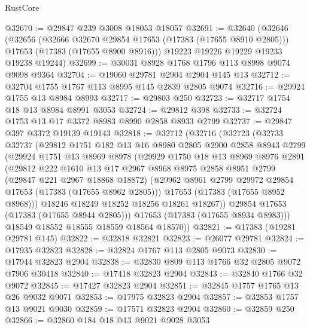 \begin{lexlean}{RustCore}
\begin{coremodule}
@32670 := @29847 @239 @3008 @18053 @18057
@32691 := @32640
    (@32646
      (@32656
        (@32666 @32670 @29854 @17653 (@17383 (@17655 @8910 @2805)))
        @17653
        (@17383 (@17655 @8900 @8916)))
      @19223
      @19226
      @19229
      @19233
      @19238
      @19244)
@32699 := @30031 @8928 @1768 @1796 @113 @8998 @9074 @9098 @9364
@32704 := @19060 @29781 @2904 @2904 @145 @13
@32712 := @32704 @1755 @1767 @113 @8995 @145 @2839 @2805 @9074
@32716 := @29924 @1755 @13 @8984 @8993
@32717 := @29803 @250
@32723 := @32717 @1754 @18 @13 @8984 @8991 @3053
@32724 := @29812 @398
@32733 := @32724 @1753 @13 @17 @3372 @8983 @8990 @2858 @8933 @2799
@32737 := @29847 @397 @3372 @19139 @19143
@32818 := @32712
    (@32716
      (@32723
        (@32733
          @32737
          (@29812
            @1751
            @182
            @13
            @16
            @8980
            @2805
            @2900
            @2858
            @8943
            @2799
            (@29924
              @1751
              @13
              @8969
              @8978
              (@29929
                @1750
                @18
                @13
                @8969
                @8976
                @2891
                (@29812
                  @222
                  @1610
                  @13
                  @17
                  @2967
                  @8968
                  @8975
                  @2858
                  @8951
                  @2799
                  (@29847 @221 @2967 @18868 @18872)
                  (@29962 @8961 @2799 @29972 @29854 @17653 (@17383 (@17655 @8962 @2805)))
                  @17653
                  (@17383 (@17655 @8952 @8968)))
                @18246
                @18249
                @18252
                @18256
                @18261
                @18267))
            @29854
            @17653
            (@17383 (@17655 @8944 @2805)))
          @17653
          (@17383 (@17655 @8934 @8983)))
        @18549
        @18552
        @18555
        @18559
        @18564
        @18570))
@32821 := @17383 (@19281 @29781 @145)
@32822 := @32818 @32821
@32823 := @26077 @29781
@32824 := @17935 @32823
@32828 := @32824 @1767 @113 @2805 @9073
@32830 := @17944 @32823 @2904
@32838 := @32830 @809 @113 @1766 @32 @2805 @9072 @7906 @30418
@32840 := @17418 @32823 @2904
@32843 := @32840 @1766 @32 @9072
@32845 := @17427 @32823 @2904
@32851 := @32845 @1757 @1765 @13 @26 @9032 @9071
@32853 := @17975 @32823 @2904
@32857 := @32853 @1757 @13 @9021 @9030
@32859 := @17571 @32823 @2904
@32860 := @32859 @250
@32866 := @32860 @184 @18 @13 @9021 @9028 @3053

\end{coremodule}
\end{lexlean}

